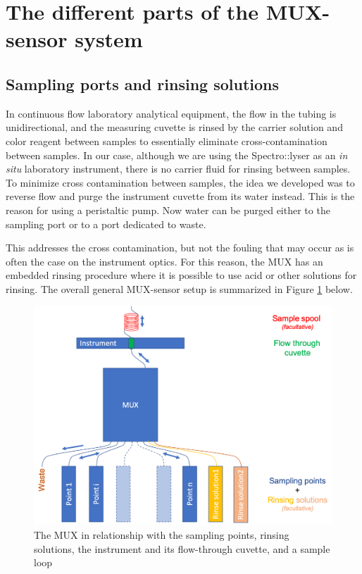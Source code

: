 \documentclass[]{book}
\begin{document}
\hypertarget{the-different-parts-of-the-mux-sensor-system}{%
\section{The different parts of the MUX-sensor system}\label{the-different-parts-of-the-mux-sensor-system}}

\hypertarget{sampling-ports-and-rinsing-solutions}{%
\subsection{Sampling ports and rinsing solutions}\label{sampling-ports-and-rinsing-solutions}}

In continuous flow laboratory analytical equipment, the flow in the tubing is unidirectional, and the measuring cuvette is rinsed by the carrier solution and color reagent between samples to essentially eliminate cross-contamination between samples. In our case, although we are using the Spectro::lyser as an \emph{in situ} laboratory instrument, there is no carrier fluid for rinsing between samples. To minimize cross contamination between samples, the idea we developed was to reverse flow and purge the instrument cuvette from its water instead. This is the reason for using a peristaltic pump. Now water can be purged either to the sampling port or to a port dedicated to waste.

This addresses the cross contamination, but not the fouling that may occur as is often the case on the instrument optics. For this reason, the MUX has an embedded rinsing procedure where it is possible to use acid or other solutions for rinsing. The overall general MUX-sensor setup is summarized in Figure \ref{fig:WorkLayout} below.

\begin{figure}

{\centering \includegraphics[width=0.8\linewidth]{pictures/WorkLayout} 

}

\caption{The MUX in relationship with the sampling points, rinsing solutions, the instrument and its flow-through cuvette, and a sample loop}\label{fig:WorkLayout}
\end{figure}
\end{document}
